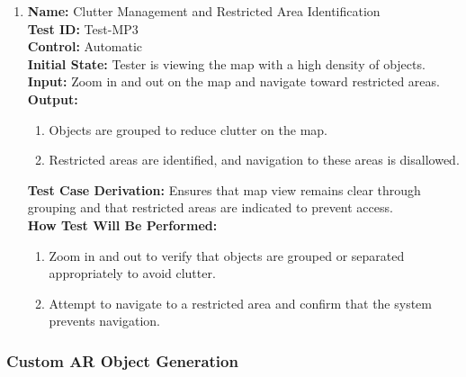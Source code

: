 \documentclass[12pt, titlepage]{article}
\begin{document}
\begin{enumerate}
  \item \textbf{Name:} Clutter Management and Restricted Area Identification \label{itm:Test-MP3} \\
        \textbf{Test ID:} Test-MP3 \\
        \textbf{Control:} Automatic \\
        \textbf{Initial State:} Tester is viewing the map with a high density of objects. \\
        \textbf{Input:} Zoom in and out on the map and navigate toward restricted areas. \\
        \textbf{Output:}
        \begin{enumerate}
          \item Objects are grouped to reduce clutter on the map.
          \item Restricted areas are identified, and navigation to these areas is disallowed.
        \end{enumerate}
        \textbf{Test Case Derivation:} Ensures that map view remains clear through grouping and that restricted areas are indicated to prevent access. \\
        \textbf{How Test Will Be Performed:}
        \begin{enumerate}
          \item Zoom in and out to verify that objects are grouped or separated appropriately to avoid clutter.
          \item Attempt to navigate to a restricted area and confirm that the system prevents navigation.
        \end{enumerate}

\end{enumerate}

\subsubsection{Custom AR Object Generation}
\end{document}
